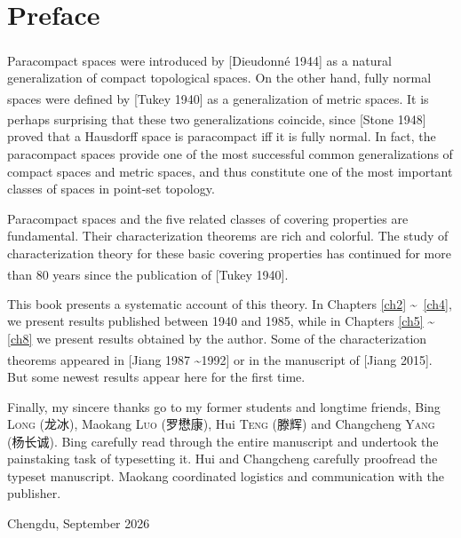 \chapter*{Preface}

\indent\indent
Paracompact spaces were introduced by 
[Dieudonné 1944]\textsuperscript{\cite{Dieudonne}}
 as a natural generalization 
of compact topological spaces. On the other hand, fully normal spaces were 
defined by [Tukey 1940]\textsuperscript{\cite{Tukey}}
 as a generalization of metric spaces. It is perhaps 
surprising that these two generalizations coincide, since 
[Stone 1948] \textsuperscript{\cite{Stone}}
proved that a Hausdorff space is paracompact iff it is fully normal. 
In fact, the paracompact spaces provide one of the most successful common 
generalizations of compact spaces and metric spaces, and thus constitute 
one of the most important classes of spaces in point-set topology.

Paracompact spaces and the five related classes of covering properties 
are fundamental. Their characterization theorems are rich and colorful. 
The study of characterization theory for these basic covering properties 
has continued for more than 80 years since the publication of 
[Tukey 1940]\textsuperscript{\cite{Tukey}}.

This book presents a systematic account of this theory. In Chapters 
\ref{ch2} \textasciitilde\,  \ref{ch4}, 
we present results published between 1940 and 1985, while in 
Chapters \ref{ch5} \textasciitilde \,  \ref{ch8} 
we present results obtained by the author. Some of the characterization 
theorems appeared in [Jiang 1987 \textasciitilde 1992]
\textsuperscript{\cite{Jiang1987a}
	\cite{Jiang1987b}
	\cite{Jiang1988}
	\cite{Jiang1989}
	\cite{Jiang1991}
	\cite{Jiang1992}
	\cite{Jiang1993}
}	
or in the manuscript of [Jiang 2015]\textsuperscript{\cite{Jiang2015}}. 
But some newest results appear here for the first time.


Finally, my sincere thanks go to my former students and longtime friends,
Bing \textsc{Long} (龙冰), Maokang \textsc{Luo} (罗懋康), Hui \textsc{Teng} (滕辉) 
and Changcheng \textsc{Yang} (杨长诚). 
Bing carefully read through the 
entire manuscript and undertook the painstaking task of typesetting it. 
Hui and Changcheng carefully proofread the typeset manuscript.
Maokang coordinated logistics and communication with the publisher.

\vspace{100pt}

\noindent Chengdu, September 2026







